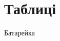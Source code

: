 \documentclass[a4paper,12pt]{article}
\begin{document}
	\newpage
	\recalctypearea
	\section{Таблиці}

\begin{table}[htp]\centering
	\label{table:battery}
	\begin{flushright}
		\caption{Батарейка}
	\end{flushright}	
\begin{adjustwidth}{-2cm}{}
\begin{tabular}{|c|c|c|c|c|c|c|c|c|c|c|c|c|c|c|c|c|c|c|c|c|}


\end{tabular}
\end{adjustwidth}
\end{table}
\end{document}
